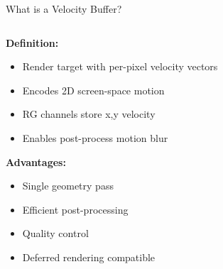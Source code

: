 \documentclass[aspectratio=169]{beamer}
\begin{document}
\begin{frame}{What is a Velocity Buffer?}
    \begin{columns}[t]
        \begin{column}{0.58\textwidth}
            \textbf{Definition:}
            \begin{itemize}
                \item Render target with per-pixel velocity vectors
                \item Encodes 2D screen-space motion  
                \item RG channels store x,y velocity
                \item Enables post-process motion blur
            \end{itemize}
            
            \vspace{0.2cm}
            \textbf{Advantages:}
            \begin{itemize}
                \item[\textcolor{green}{\checkmark}] Single geometry pass
                \item[\textcolor{green}{\checkmark}] Efficient post-processing
                \item[\textcolor{green}{\checkmark}] Quality control
                \item[\textcolor{green}{\checkmark}] Deferred rendering compatible
            \end{itemize}
            
            \vspace{0.2cm}
            
        \end{column}
        
        \begin{column}{0.42\textwidth}
        
\end{column}
\end{columns}
\end{frame}
\end{document}
